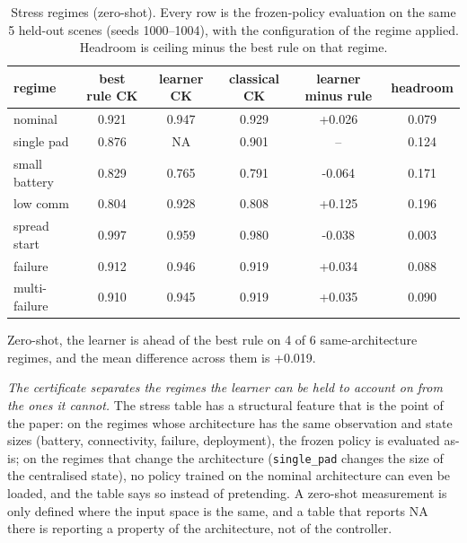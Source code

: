 \documentclass[conference]{IEEEtran}
\begin{document}
\begin{table}[t]
\caption{Stress regimes (zero-shot).  Every row is the frozen-policy
evaluation on the same 5 held-out scenes (seeds 1000--1004), with the
configuration of the regime applied.  Headroom is ceiling minus the best rule on that regime.}
\label{tab:stress}
\centering
\scriptsize
\setlength{\tabcolsep}{3pt}
\begin{tabular}{@{}lccccc@{}}
\toprule
regime & best rule CK & learner CK & classical CK & learner minus rule & headroom \\
\midrule
nominal        & 0.921 & 0.947 & 0.929 & +0.026 & 0.079 \\
single pad     & 0.876 & NA & 0.901 & -- & 0.124 \\
small battery  & 0.829 & 0.765 & 0.791 & -0.064 & 0.171 \\
low comm       & 0.804 & 0.928 & 0.808 & +0.125 & 0.196 \\
spread start & 0.997 & 0.959 & 0.980 & -0.038 & 0.003 \\
failure        & 0.912 & 0.946 & 0.919 & +0.034 & 0.088 \\
multi-failure  & 0.910 & 0.945 & 0.919 & +0.035 & 0.090 \\
\bottomrule
\end{tabular}
\par\vspace{2.5pt}{\scriptsize\itshape The headroom gate of the evaluation framework requires ceiling minus
best rule $\ge 0.10$ on a regime before a learned controller on that regime is
meaningfully compared: below it, the ceiling is too close for a controller
comparison to separate anything.  Regimes whose best rule leaves less than
0.10 of headroom are reported as such rather than forced through the gate.}
\end{table}

Zero-shot, the learner is ahead of the best rule on 4 of 6 same-architecture regimes, and the mean difference across them is +0.019.


\emph{The certificate separates the regimes the learner can be held to
account on from the ones it cannot.}  The stress table has a structural
feature that is the point of the paper: on the regimes whose architecture
has the same observation and state sizes (battery, connectivity, failure,
deployment), the frozen policy is evaluated as-is; on the regimes that
change the architecture (\texttt{single\_pad} changes the size of the
centralised state), no policy trained on the nominal architecture can even
be loaded, and the table says so instead of pretending.  A zero-shot
measurement is only defined where the input space is the same, and a table
that reports NA there is reporting a property of the architecture, not of
the controller.
\end{document}
